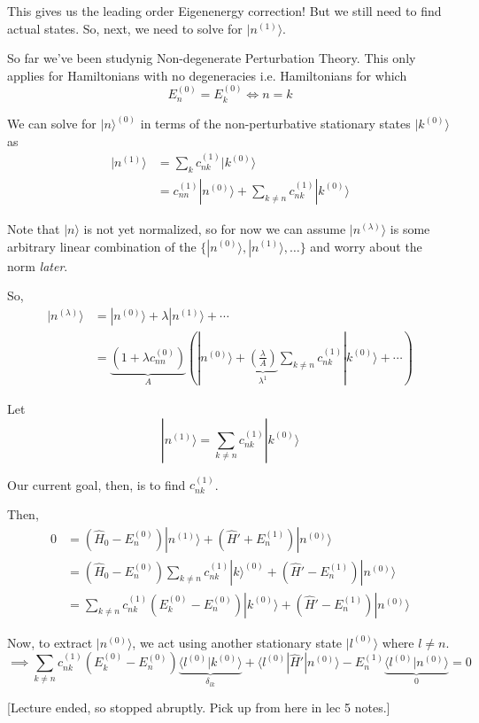 \documentclass{article}
\newcommand{\ket}[1]{|#1 \rangle}
\newcommand{\inner}[2]{\langle #1 | #2 \rangle}
\begin{document}
\vskip 0.5cm
This gives us the leading order Eigenenergy correction! But we still need to find actual states. So, next, we need to solve for $\ket{n^{(1)}}$.
\vskip 1cm
\begin{dottedbox}
  So far we've been studynig Non-degenerate Perturbation Theory. This only applies for Hamiltonians with no degeneracies i.e. Hamiltonians for which 
  \[ E_n^{(0)} = E_k^{(0)} \iff n = k \]
\end{dottedbox}

\vskip 1cm
We can solve for $\ket{n}^{(0)}$ in terms of the non-perturbative stationary states $\ket{k^{(0)}}$ as 
\begin{align*}
  \ket{n^{(1)}} &= \sum_{k} c_{nk}^{(1)} \ket{k^{(0)}} \\
  &= c_{nn}^{(1)} \ket{n^{(0)}} + \sum_{k \neq n} c_{nk}^{(1)} \ket{k^{(0)}}
\end{align*}

Note that $ \ket{n}$ is not yet normalized, so for now we can assume $\ket{n^{(\lambda)}}$ is some arbitrary linear combination of the $\{ \ket{n^{(0)}}, \ket{n^{(1)}}, \dots\}$ and worry about the norm \emph{later}.

\vskip 0.5cm
So,
\begin{align*}
  \ket{n^{(\lambda)}} &= \ket{n^{(0)}} + \lambda \ket{n^{(1)}} + \cdots \\
  &= \underbrace{\left( 1 + \lambda c_{nn}^{(0)} \right) }_{A} \left( \ket{n^{(0)}} + \underbrace{\left(\frac{\lambda}{A}\right)}_{\lambda^{1}} \sum_{k \neq n} c_{nk}^{(1)} \ket{k^{(0)}} + \cdots \right)
\end{align*}


Let 
\[ \boxed{\ket{n^{(1)}} = \sum_{k \neq n} c_{nk}^{(1)} \ket{k^{(0)}} }  \]

Our current goal, then, is to find $c_{nk}^{(1)}$.

Then, 
\begin{align*}
  0 &= \left( \hat{H}_0 - E_n^{(0)} \right) \ket{n^{(1)}} + \left( \hat{H}' + E_n^{(1)} \right) \ket{n^{(0)}} \\
  &= \left( \hat{H}_0 - E_n^{(0)} \right) \sum_{k \neq n} c_{nk}^{(1)} \ket{k}^{(0)} + \left( \hat{H}' - E_n^{(1)} \right) \ket{n^{(0)}} \\
  &= \sum_{k \neq n} c_{nk}^{(1)} \left( E_k^{(0)} - E_n^{(0)} \right) \ket{k^{(0)}} + \left( \hat{H}' - E_n^{(1)} \right) \ket{n^{(0)}}
\end{align*}

Now, to extract $\ket{n^{(0)}}$, we act using another stationary state $\ket{l^{(0)}}$ where $l \neq n$.
\[ \implies \sum_{k \neq n} c_{nk}^{(1)} \left( E_{k}^{(0)}  - E_n^{(0)} \right) \underbrace{\inner{l^{(0)}}{k^{(0)}}}_{\delta_{lk}} + \inner{l^{(0)}}{\hat{H}'| n^{(0)} } - E_n^{(1)} \underbrace{\inner{l^{(0)}}{n^{(0)}}}_{0} = 0 \]

[Lecture ended, so stopped abruptly. Pick up from here in lec 5 notes.]
\end{document}
